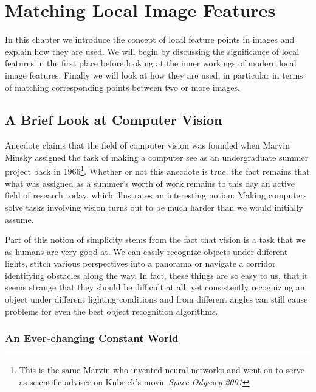 \chapter{Matching Local Image Features}
\label{C:Background}

In this chapter we introduce the concept of local feature points in 
images and explain how they are used. We will begin by discussing the 
significance of local features in the first place before looking at the 
inner workings of modern local image features. Finally we will look at 
how they are used, in particular in terms of matching corresponding 
points between two or more images.

\section{A Brief Look at Computer Vision}

Anecdote claims that the field of computer vision was founded when 
Marvin Minsky assigned the task of making a computer see as an 
undergraduate summer project back in 1966\footnote{This is the same 
    Marvin who invented neural networks and went on to serve as 
scientific adviser on Kubrick's movie \emph{Space Odyssey 2001}}.  
Whether or not this anecdote is true, the fact remains that what was 
assigned as a summer's worth of work remains to this day an active field 
of research today, which illustrates an interesting notion: Making 
computers solve tasks involving vision turns out to be much harder than 
we would initially assume.

Part of this notion of simplicity stems from the fact that vision is a 
task that we as humans are very good at. We can easily recognize objects 
under different lights, stitch various perspectives into a panorama or 
navigate a corridor identifying obstacles along the way.  In fact, these 
things are so easy to us, that it seems strange that they should be 
difficult at all; yet consistently recognizing an object under different 
lighting conditions and from different angles can still cause problems 
for even the best object recognition algorithms.

\subsection{An Ever-changing Constant World}

